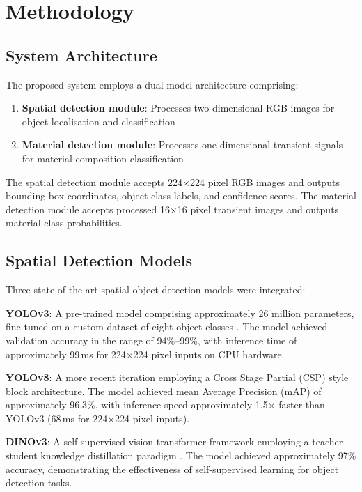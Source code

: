 \documentclass[10pt,twocolumn]{article}
\begin{document}
\section{Methodology}

\subsection{System Architecture}

The proposed system employs a dual-model architecture comprising:
\begin{enumerate}
    \item \textbf{Spatial detection module}: Processes two-dimensional RGB images for object localisation and classification
    \item \textbf{Material detection module}: Processes one-dimensional transient signals for material composition classification
\end{enumerate}

The spatial detection module accepts 224$\times$224 pixel RGB images and outputs bounding box coordinates, object class labels, and confidence scores. The material detection module accepts processed 16$\times$16 pixel transient images and outputs material class probabilities.

\subsection{Spatial Detection Models}

Three state-of-the-art spatial object detection models were integrated:

\textbf{YOLOv3}: A pre-trained model comprising approximately 26 million parameters, fine-tuned on a custom dataset of eight object classes \cite{redmon2018}. The model achieved validation accuracy in the range of 94\%--99\%, with inference time of approximately 99\,ms for 224$\times$224 pixel inputs on CPU hardware.

\textbf{YOLOv8}: A more recent iteration employing a Cross Stage Partial (CSP) style block architecture. The model achieved mean Average Precision (mAP) of approximately 96.3\%, with inference speed approximately 1.5$\times$ faster than YOLOv3 (68\,ms for 224$\times$224 pixel inputs).

\textbf{DINOv3}: A self-supervised vision transformer framework employing a teacher-student knowledge distillation paradigm \cite{simeoni2025}. The model achieved approximately 97\% accuracy, demonstrating the effectiveness of self-supervised learning for object detection tasks.
\end{document}
